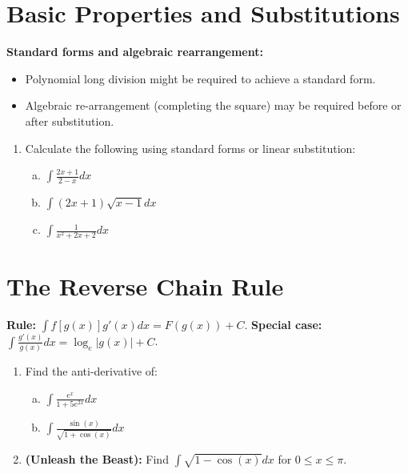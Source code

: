 \documentclass[12pt]{article}
\begin{document}
 

 \section*{Basic Properties and Substitutions} 

 \noindent \textbf{Standard forms and algebraic rearrangement:} 
 \begin{itemize} 
     \item Polynomial long division might be required to achieve a standard form. 
     \item Algebraic re-arrangement (completing the square) may be required before or after substitution. 
 \end{itemize} 

 \begin{enumerate} 
     \item Calculate the following using standard forms or linear substitution:
     \begin{enumerate}[a.] 
         \item $\displaystyle \int\frac{2x+1}{2-x}dx$ 
         \vspace{1.5cm} 
         \item $\displaystyle \int(2x+1)\sqrt{x-1}dx$ 
         \vspace{1.5cm} 
         \item $\displaystyle \int\frac{1}{x^{2}+2x+2}dx$ 
     \end{enumerate} 
 \end{enumerate} 

 \section*{The Reverse Chain Rule} 
 \noindent \textbf{Rule:} $\displaystyle \int f[g(x)]g'(x) dx = F(g(x)) + C$. 
 \textbf{Special case:} $\displaystyle \int\frac{g'(x)}{g(x)}dx=\log_{e}|g(x)|+C$. 

 \begin{enumerate} 
     \item Find the anti-derivative of:
     \begin{enumerate}[a.] 
         \item $\displaystyle \int\frac{e^{x}}{1+5e^{2x}}dx$ 
         \vspace{1.5cm} 
         \item $\displaystyle \int \frac{\sin(x)}{\sqrt{1+\cos(x)}}dx$ 
     \end{enumerate} 
      
     \item \textbf{(Unleash the Beast):} Find $\displaystyle \int\sqrt{1-\cos(x)}dx$ for $0\le x\le\pi$. 
 \end{enumerate} 
\end{document}
